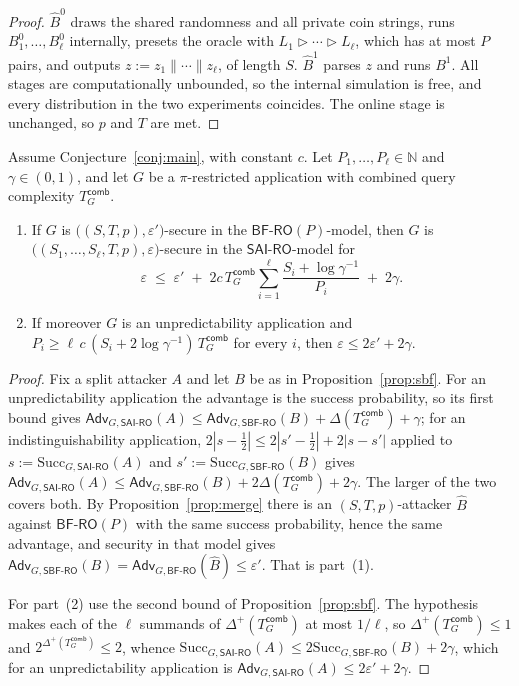 \documentclass{conjura-conjecture}
\newcommand{\Adv}{\mathsf{Adv}}
\newcommand{\Succ}{\mathrm{Succ}}
\newcommand{\SAI}{\mathsf{SAI\text{-}RO}}
\newcommand{\SBF}{\mathsf{SBF\text{-}RO}}
\newcommand{\BF}{\mathsf{BF\text{-}RO}}
\newcommand{\Tcomb}{T^{\mathsf{comb}}_{G}}
\newcommand{\merge}{\mathbin{\triangleright}}
\begin{document}
\begin{proof}
$\widehat{B}^{0}$ draws the shared randomness and all private coin
strings, runs $B^{0}_1,\dots,B^{0}_\ell$ internally, presets the oracle
with $L_1 \merge \cdots \merge L_\ell$, which has at most $P$ pairs, and
outputs $z := z_1\|\cdots\|z_\ell$, of length $S$. $\widehat{B}^{1}$
parses $z$ and runs $B^{1}$. All stages are computationally unbounded, so
the internal simulation is free, and every distribution in the two
experiments coincides. The online stage is unchanged, so $p$ and $T$ are
met.
\end{proof}

\begin{theorem}\label{thm:aibf}
Assume Conjecture~\ref{conj:main}, with constant $c$. Let
$P_1,\dots,P_\ell \in \mathbb{N}$ and $\gamma \in (0,1)$, and let $G$ be a
$\pi$-restricted application with combined query complexity $\Tcomb$.
\begin{enumerate}
\item If $G$ is $\bigl((S,T,p),\varepsilon'\bigr)$-secure in the
  $\BF(P)$-model, then $G$ is
  $\bigl((S_1,\dots,S_\ell,T,p),\varepsilon\bigr)$-secure in the
  $\SAI$-model for
  \[
    \varepsilon \;\le\; \varepsilon'
    \;+\; 2c\,\Tcomb\sum_{i=1}^{\ell}\frac{S_i+\log\gamma^{-1}}{P_i}
    \;+\; 2\gamma .
  \]
\item If moreover $G$ is an unpredictability application and
  $P_i \ge \ell\,c\,(S_i + 2\log\gamma^{-1})\,\Tcomb$ for every $i$, then
  $\varepsilon \le 2\varepsilon' + 2\gamma$.
\end{enumerate}
\end{theorem}

\begin{proof}
Fix a split attacker $A$ and let $B$ be as in
Proposition~\ref{prop:sbf}. For an unpredictability application the
advantage is the success probability, so its first bound gives
$\Adv_{G,\SAI}(A) \le \Adv_{G,\SBF}(B) + \Delta(\Tcomb) + \gamma$; for an
indistinguishability application, $2|s-\tfrac12| \le 2|s'-\tfrac12| +
2|s-s'|$ applied to $s := \Succ_{G,\SAI}(A)$ and $s' := \Succ_{G,\SBF}(B)$
gives $\Adv_{G,\SAI}(A) \le \Adv_{G,\SBF}(B) + 2\Delta(\Tcomb) + 2\gamma$.
The larger of the two covers both. By Proposition~\ref{prop:merge} there
is an $(S,T,p)$-attacker $\widehat{B}$ against $\BF(P)$ with the same
success probability, hence the same advantage, and security in that model
gives $\Adv_{G,\SBF}(B) = \Adv_{G,\BF}(\widehat{B}) \le \varepsilon'$.
That is part~(1).

For part~(2) use the second bound of Proposition~\ref{prop:sbf}. The
hypothesis makes each of the $\ell$ summands of $\Delta^{+}(\Tcomb)$ at
most $1/\ell$, so $\Delta^{+}(\Tcomb) \le 1$ and
$2^{\Delta^{+}(\Tcomb)} \le 2$, whence $\Succ_{G,\SAI}(A) \le
2\Succ_{G,\SBF}(B) + 2\gamma$, which for an unpredictability application
is $\Adv_{G,\SAI}(A) \le 2\varepsilon' + 2\gamma$.
\end{proof}
\end{document}

